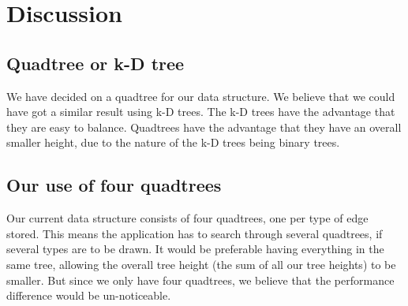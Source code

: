\documentclass[a4paper,11pt]{article}
\begin{document}
\pagebreak
\section{Discussion}
\label{sec:Discussion}

\subsection{Quadtree or k-D tree}
We have decided on a quadtree for our data structure. We believe that we could have got a similar result using k-D trees. The k-D trees have the advantage that they are easy to balance. Quadtrees have the advantage that they have an overall smaller height, due to the nature of the k-D trees being binary trees.

\subsection{Our use of four quadtrees}
Our current data structure consists of four quadtrees, one per type of edge stored. This means the application has to search through several quadtrees, if several types are to be drawn. It would be preferable having everything in the same tree, allowing the overall tree height (the sum of all our tree heights) to be smaller. But since we only have four quadtrees, we believe that the performance difference would be un-noticeable.
\end{document}
